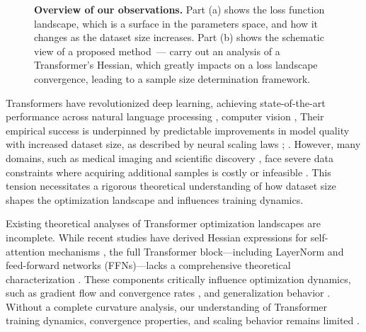 \documentclass{article}
\begin{document}
\begin{figure}[h]
    \caption{\textbf{Overview of our observations.} Part (a) shows the loss function landscape, which is a
surface in the parameters space, and how it changes as the dataset size increases. Part (b) shows the schematic view of a proposed method~--- carry out an analysis of a Transformer's Hessian, which greatly impacts on a loss landscape convergence, leading to a sample size determination framework.}
    \label{fig:introduction}
\end{figure}

Transformers \cite{vaswani2017attention} have revolutionized deep learning, achieving state-of-the-art performance across natural language processing \cite{devlin2019bert, brown2020language}, computer vision \cite{dosovitskiy2021image, wu2020visualtransformer}, 
Their empirical success is underpinned by predictable improvements in model quality with increased dataset size, as described by neural scaling laws \cite{kaplan2020scaling}; \cite{hoffmann2022training, bahri2024explainingscalinglaws}. However, many domains, such as medical imaging \cite{moreno2024medicalfewshot} and scientific discovery \cite{jumper2021highly}, face severe data constraints where acquiring additional samples is costly or infeasible \cite{chen2025dataefficientgeneralizationzeroshotcomposed}. %
This tension necessitates a rigorous theoretical understanding of how dataset size shapes the optimization landscape and influences training dynamics.

Existing theoretical analyses of Transformer optimization landscapes are incomplete. While recent studies have derived Hessian expressions for self-attention mechanisms \cite{ormaniec2024attentionhessian, zhang2024why}, the full Transformer block—including LayerNorm and feed-forward networks (FFNs)—lacks a comprehensive theoretical characterization \cite{noci2022signalpropagationtransformerstheoretical, zhang2025understanding}. %
These components critically influence optimization dynamics, such as gradient flow and convergence rates \cite{noci2022signalpropagationtransformerstheoretical, unknown}, and generalization behavior \cite{zhang2025understandinggeneralizationincontextlearning, csordas-etal-2021-devil}. Without a complete curvature analysis, our understanding of Transformer training dynamics, convergence properties, and scaling behavior remains limited \cite{fort2019emergentpropertieslocalgeometry}.
\end{document}
